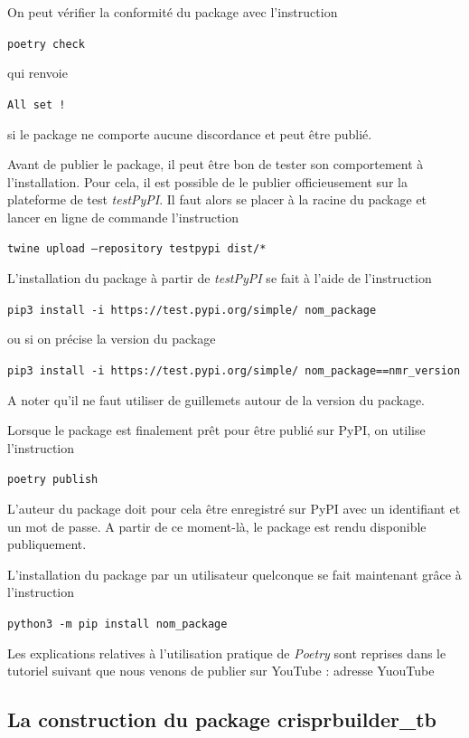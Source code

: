 \documentclass[twoside,a4paper,11pt,frenchb,openany]{report}
\begin{document}
On peut vérifier la conformité du package avec l’instruction
\begin{tcolorbox}\texttt{poetry check}\end{tcolorbox}
qui renvoie
\begin{tcolorbox}\texttt{All set !}\end{tcolorbox}
si le package ne comporte aucune discordance et peut être publié.

Avant de publier le package, il peut être bon de tester son comportement à l'installation. Pour cela, il est possible de le publier officieusement sur la plateforme de test \textit{testPyPI}. Il faut alors se placer à la racine du package et lancer en ligne de commande l'instruction
\begin{tcolorbox}\texttt{twine upload --repository testpypi dist/*}\end{tcolorbox}

L'installation du package à partir de \textit{testPyPI} se fait à l'aide de l'instruction
\begin{tcolorbox}\texttt{pip3 install -i https://test.pypi.org/simple/ nom\_package}\end{tcolorbox} ou si on précise la version du package
\begin{tcolorbox}\texttt{pip3 install -i https://test.pypi.org/simple/ nom\_package==nmr\_version}\end{tcolorbox} A noter qu'il ne faut utiliser de guillemets autour de la version du package.

Lorsque le package est finalement prêt pour être publié sur PyPI, on utilise l’instruction
\begin{tcolorbox}\texttt{poetry publish}\end{tcolorbox}
L'auteur du package doit pour cela être enregistré sur PyPI avec un identifiant et un mot de passe. A partir de ce moment-là, le package est rendu disponible publiquement.

L’installation du package par un utilisateur quelconque se fait maintenant grâce à l’instruction
\begin{tcolorbox}\texttt{python3 -m pip install nom\_package}\end{tcolorbox}

Les explications relatives à l’utilisation pratique de \textit{Poetry} sont reprises dans le tutoriel suivant que nous venons de publier sur YouTube : adresse YuouTube



\subsection{La construction du package crisprbuilder\_tb}
\end{document}
